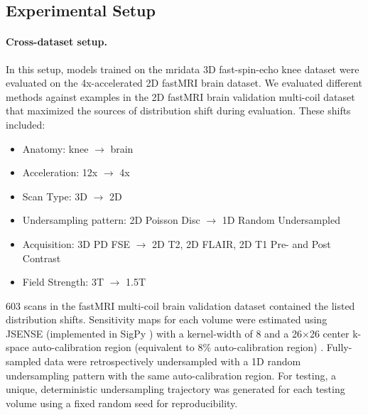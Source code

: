 \documentclass[10pt,twocolumn,letterpaper]{article}
\newcommand{\RV}[1]{{#1}}
\begin{document}
\RV{
\subsection{Experimental Setup}
\label{app:experimental-setup}
\paragraph{Cross-dataset setup.} In this setup, models trained on the mridata 3D fast-spin-echo knee dataset were evaluated on the 4x-accelerated 2D fastMRI brain dataset. We evaluated different methods against examples in the 2D fastMRI brain validation multi-coil dataset that maximized the sources of distribution shift during evaluation. These shifts included:
\begin{itemize}[noitemsep]
    \item Anatomy: knee $\rightarrow$ brain
    \item Acceleration: 12x $\rightarrow$ 4x
    \item Scan Type: 3D $\rightarrow$ 2D
    \item Undersampling pattern: 2D Poisson Disc $\rightarrow$ 1D Random Undersampled
    \item Acquisition: 3D PD FSE $\rightarrow$ 2D T2, 2D FLAIR, 2D T1 Pre- and Post Contrast
    \item Field Strength: 3T $\rightarrow$ 1.5T
\end{itemize}
603 scans in the fastMRI multi-coil brain validation dataset contained the listed distribution shifts. Sensitivity maps for each volume were estimated using JSENSE (implemented in SigPy \cite{sigpy}) with a kernel-width of 8 and a 26$\times$26 center k-space auto-calibration region (equivalent to 8\% auto-calibration region) \cite{ying2007joint}. Fully-sampled data were retrospectively undersampled with a 1D random undersampling pattern with the same auto-calibration region. For testing, a unique, deterministic undersampling trajectory was generated for each testing volume using a fixed random seed for reproducibility.
}

\begin{table}[t!]
\begin{center}
\end{center}
\caption{Regularization parameter selection for compressed sensing at various noise levels with 12x and 16x acceleration ($R$).}
\label{tbl:cs-reg}
\end{table}
\end{document}
